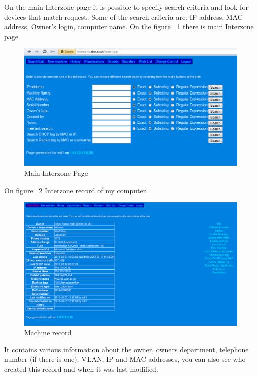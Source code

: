 \documentclass[10pt,a4paper,headinclude=true]{report}
\begin{document}
On the main Interzone page it is possible to specify search criteria and look for devices that match request. Some of the search criteria are: IP address, MAC address, Owner's login, computer name. On the figure ~\ref{fig:main_interzone_page} there is main Interzone page.

\begin{figure}[H]
\centering
\centerline{\includegraphics[scale=0.5]{./main_interzone_page}}
\caption{Main Interzone Page}
\label{fig:main_interzone_page}
\end{figure}

On figure ~\ref{fig:machine_record} Interzone record of my computer.

\begin{figure}[H]
\centering
\centerline{\includegraphics[scale=0.5]{./machine_record}}
\caption{Machine record}
\label{fig:machine_record}
\end{figure}

It contains various information about the owner, owners department, telephone number (if there is one), VLAN, IP and MAC addresses, you can also see who created this record and when it was last modified.
\end{document}
